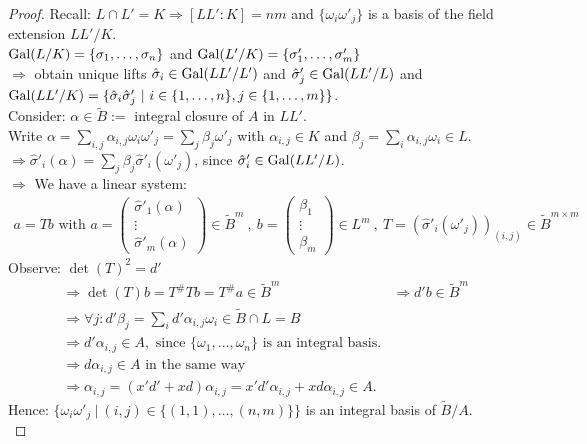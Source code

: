 \begin{proof}
Recall: $L \cap L' =K \Rightarrow [LL' :K]=nm$ and $\{\omega_i\omega'_j\}$ is a basis of the field extension $LL' / K$.\\
$\operatorname{Gal}(L/K)=\{\sigma_1, \dots, \sigma_n\}$ and $\operatorname{Gal}(L'/K) = \{\sigma'_1, \dots, \sigma'_m\}$\\
$\Rightarrow$ obtain unique lifts $\hat{\sigma}_i \in \operatorname{Gal}(LL'/L')$ and $\hat{\sigma}'_j \in \operatorname{Gal}(LL'/L)$ and $\Gal(LL'/K)=\{\hat{\sigma}_i \hat{\sigma}'_j \ | \ i \in \{1, \dots, n \}, j \in \{1, \dots, m\}\}$.\\
Consider: $\alpha \in \tilde{B}:= $ integral closure of $A$ in $LL'$.\\
Write $\alpha = \sum_{i,j} \alpha_{i,j} \omega_i \omega'_j = \sum_j \beta_j \omega'_j$ with $\alpha_{i,j} \in K$ and $\beta_j= \sum_i \alpha_{i,j} \omega_i \in L$.\\
$\Rightarrow \hat{\sigma}'_i(\alpha) = \sum_j \beta_j \hat{\sigma}'_i(\omega'_j)$, since $\hat{\sigma}'_i \in \operatorname{Gal}(LL'/L)$.\\
$\Rightarrow$ We have a linear system:
\begin{align*}
a=Tb \text{ with } a = \begin{pmatrix}
\hat{\sigma}'_1(\alpha)\\
\vdots\\
\hat{\sigma}'_m(\alpha)
\end{pmatrix}
\in \tilde{B}^m \ , \ b = \begin{pmatrix}
\beta_1\\
\vdots\\
\beta_m
\end{pmatrix} \in L^m
\ ,\ T=(\hat{\sigma}'_i(\omega'_j))_{(i,j)} \in \tilde{B}^{m \times m}
\end{align*}
Observe: $\det(T)^2 = d'$
\begin{align*}
&\Rightarrow \det(T) b = T^{\#} T b = T^{\#}a \in \tilde{B}^m &\Rightarrow d'b \in \tilde{B}^m\\
&\Rightarrow \forall j: d' \beta_j = \sum_i d'\alpha_{i,j} \omega_i \in \tilde{B} \cap L =B\\
&\Rightarrow d' \alpha_{i,j} \in A, \text{ since } \{\omega_1, \dots, \omega_n\} \text{ is an integral basis}.\\
&\Rightarrow d\alpha_{i,j} \in A \text{ in the same way}\\
&\Rightarrow \alpha_{i,j} = (x'd'+xd) \alpha_{i,j}=x'd'\alpha_{i,j}+xd\alpha_{i,j} \in A.
\end{align*}
Hence: $\{\omega_i \omega'_j \ | \ (i,j) \in \{(1,1), \dots, (n,m)\}\}$ is an integral basis of $\tilde{B}/A$.\\

\end{proof}
